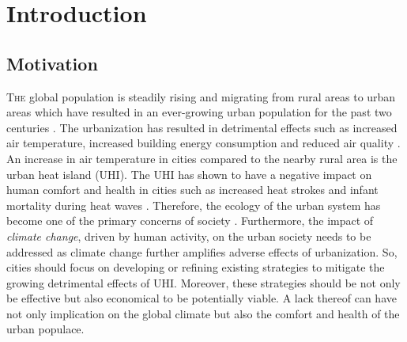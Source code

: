 \chapter{Introduction}
\label{ch:introduction}

\def\figdir{chapters/ch01_introduction/figures}


%		

\section{Motivation}

\lettrine[lines=3,nindent=0em,loversize=0.1]{T}{he} global population is steadily rising and migrating from rural areas to urban areas which have resulted in an ever-growing urban population for the past two centuries \citep{Oke2017a}. The urbanization has resulted in detrimental effects such as increased air temperature, increased building energy consumption and reduced air quality \citep{santamouris2001energy,Kovats2008,Salmond2016}. An increase in air temperature in cities compared to the nearby rural area is the urban heat island (UHI). The UHI has shown to have a negative impact on human comfort and health in cities such as increased heat strokes and infant mortality during heat waves \citep{Fouillet2006}. Therefore, the ecology of the urban system has become one of the primary concerns of society \citep{pachauri2014climate}. Furthermore, the impact of \textit{climate change}, driven by human activity, on the urban society needs to be addressed as climate change further amplifies adverse effects of urbanization. So, cities should focus on developing or refining existing strategies to mitigate the growing detrimental effects of UHI. Moreover, these strategies should be not only be effective but also economical to be potentially viable. A lack thereof can have not only implication on the global climate but also the comfort and health of the urban populace. 

